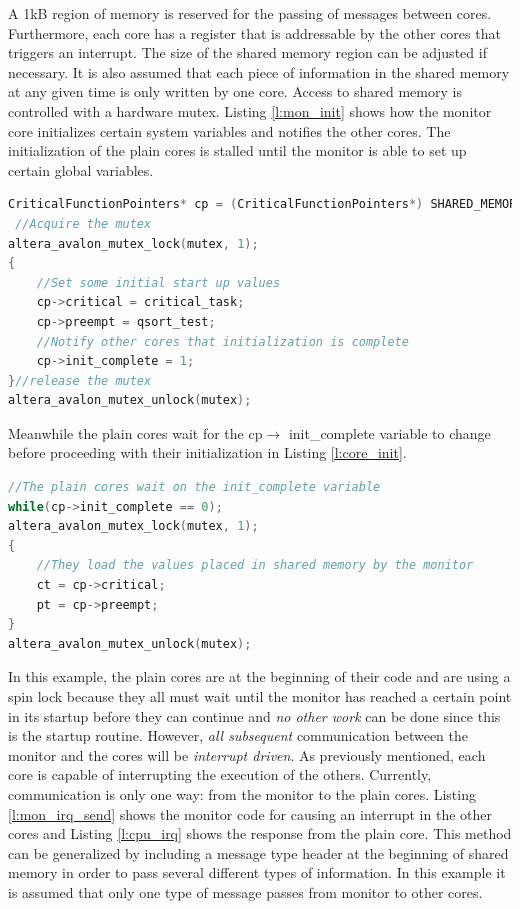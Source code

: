 A 1kB region of memory is reserved for the passing of messages between cores. Furthermore, each core has a register that is addressable by the other cores that triggers an interrupt. The size of the shared memory region can be adjusted if necessary. It is also assumed that each piece of information in the shared memory at any given time is only written by one core. Access to shared memory is controlled with a hardware mutex. Listing \ref{l:mon_init} shows how the monitor core initializes certain system variables and notifies the other cores. The initialization of the plain cores is stalled until the monitor is able to set up certain global variables.

 \begin{lstlisting}[frame=single,language=C,label=l:mon_init,caption={[Monitor passes messages to other cores]The monitor core aquires a hardware mutex and uses shared memory to pass messages to the other cores}] 
 CriticalFunctionPointers* cp = (CriticalFunctionPointers*) SHARED_MEMORY_BASE;
 //Acquire the mutex
altera_avalon_mutex_lock(mutex, 1);
{
	//Set some initial start up values
	cp->critical = critical_task;
	cp->preempt = qsort_test;
	//Notify other cores that initialization is complete
	cp->init_complete = 1;
}//release the mutex
altera_avalon_mutex_unlock(mutex);
 \end{lstlisting}
Meanwhile the plain cores wait for the cp$\rightarrow$ init\_complete variable to change before proceeding with their initialization in Listing \ref{l:core_init}.

\begin{lstlisting}[frame=single,language=C,label=l:core_init,caption={[Plain core startup synchronization]Plain core waits for the initialization by the monitor to finish before updating the variables}] 
//The plain cores wait on the init_complete variable
while(cp->init_complete == 0);
altera_avalon_mutex_lock(mutex, 1);			
{
	//They load the values placed in shared memory by the monitor
	ct = cp->critical;
	pt = cp->preempt;
}
altera_avalon_mutex_unlock(mutex);		
\end{lstlisting}


In this example, the plain cores are at the beginning of their code and are using a spin lock because they all must wait until the monitor has reached a certain point in its startup before they can continue and \emph{no other work} can be done since this is the startup routine. However, \emph{all subsequent} communication between the monitor and the cores will be \emph{interrupt driven}. As previously mentioned, each core is capable of interrupting the execution of the others. Currently, communication is only one way: from the monitor to the plain cores. Listing \ref{l:mon_irq_send} shows the monitor code for causing an interrupt in the other cores and Listing \ref{l:cpu_irq} shows the response from the plain core. This method can be generalized by including a message type header at the beginning of shared memory in order to pass several different types of information. In this example it is assumed that only one type of message passes from monitor to other cores.

